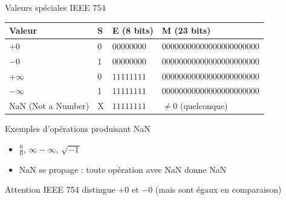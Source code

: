 \documentclass[aspectratio=1610]{beamer}
\begin{document}
\begin{frame}{Valeurs spéciales IEEE 754}

  \begin{center}
    \begin{tabular}{|l|l|l|l|}
      \hline
      \textbf{Valeur} & \textbf{S} & \textbf{E (8 bits)} & \textbf{M (23 bits)} \\
      \hline
      \hline
      $+0$ & 0 & $00000000$ & $00000000000000000000000$ \\
      \hline
      $-0$ & 1 & $00000000$ & $00000000000000000000000$ \\
      \hline
      \hline
      $+\infty$ & 0 & $11111111$ & $00000000000000000000000$ \\
      \hline
      $-\infty$ & 1 & $11111111$ & $00000000000000000000000$ \\
      \hline
      \hline
      NaN (Not a Number) & X & $11111111$ & $\neq 0$ (quelconque) \\
      \hline
    \end{tabular}
  \end{center}

  \vspace{0.5cm}

  \begin{exampleblock}{Exemples d'opérations produisant NaN}
    \begin{itemize}
      \item $\frac{0}{0}$, $\infty - \infty$, $\sqrt{-1}$
      \item NaN se propage : toute opération avec NaN donne NaN
    \end{itemize}
  \end{exampleblock}


  \begin{alertblock}{ Attention}
    IEEE 754 distingue $+0$ et $-0$ (mais sont égaux en comparaison)
  \end{alertblock}

\end{frame}
\end{document}
